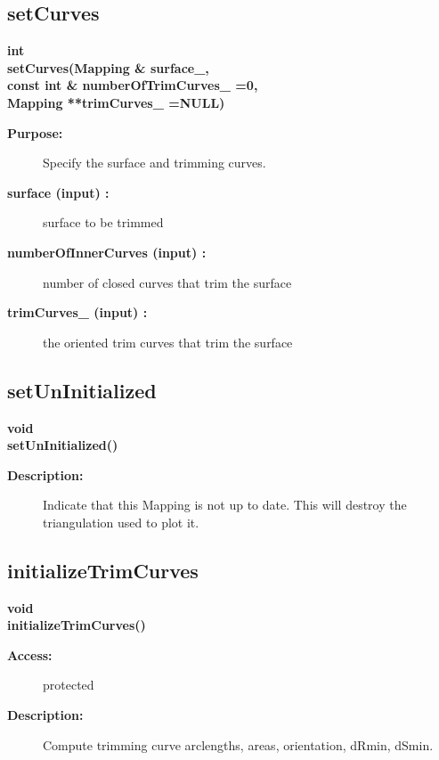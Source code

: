 \subsection{setCurves}
 
\begin{flushleft} \textbf{%
int  \\ 
\settowidth{\TrimmedMappingIncludeArgIndent}{setCurves(}%
setCurves(Mapping \& surface\_, \\ 
\hspace{\TrimmedMappingIncludeArgIndent}const int \& numberOfTrimCurves\_  =0, \\ 
\hspace{\TrimmedMappingIncludeArgIndent}Mapping **trimCurves\_  =NULL)
}\end{flushleft}
\begin{description}
\item[{\bf Purpose:}]  
    Specify the surface and trimming curves.
\item[{\bf surface (input) :}]  surface to be trimmed
\item[{\bf numberOfInnerCurves (input) :}]  number of closed curves that trim the surface
\item[{\bf trimCurves\_ (input) :}]  the oriented trim curves that trim the surface
\end{description}
\subsection{setUnInitialized}
 
\begin{flushleft} \textbf{%
void  \\ 
\settowidth{\TrimmedMappingIncludeArgIndent}{setUnInitialized(}%
setUnInitialized() 
}\end{flushleft}
\begin{description}
\item[{\bf Description:}] 
    Indicate that this Mapping is not up to date. This will destroy the triangulation used to plot it.
   
\end{description}
\subsection{initializeTrimCurves}
 
\begin{flushleft} \textbf{%
void \\ 
\settowidth{\TrimmedMappingIncludeArgIndent}{initializeTrimCurves(}%
initializeTrimCurves()
}\end{flushleft}
\begin{description}
\item[{\bf Access:}]  protected
\item[{\bf Description:}] 
   
     Compute trimming curve arclengths, areas, orientation, dRmin, dSmin.

\end{description}
